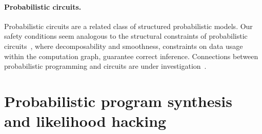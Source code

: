 \documentclass[preprint]{uai2026} %
\begin{document}
\paragraph{Probabilistic circuits.}
Probabilistic circuits are a related class of structured probabilistic models. Our safety conditions seem analogous to the structural constraints of probabilistic circuits~\cite{choi2020circuits}, where decomposability and smoothness, constraints on data usage within the computation graph, guarantee correct inference. Connections between probabilistic programming and circuits are under investigation~\citep[e.g.,][]{saad2021sppl,holtzen2020dice}.

\section{Probabilistic program synthesis and likelihood hacking}
\end{document}

